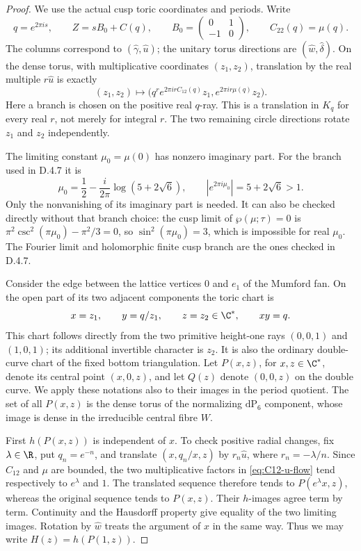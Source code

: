 \begin{proof}
We use the actual cusp toric coordinates and periods. Write
\[
 q=e^{2\pi i s},\qquad
 Z=sB_0+C(q),\qquad
 B_0=\begin{pmatrix}0&1\\-1&0\end{pmatrix},
 \qquad C_{22}(q)=\mu(q).
\]
The columns correspond to $(\widehat\gamma,\widehat u)$;
the unitary torus directions are $(\widehat w,\widehat\delta)$.
On the dense torus, with multiplicative coordinates $(z_1,z_2)$,
translation by the real multiple $r\widehat u$ is exactly
\begin{equation}\label{eq:C12-u-flow}
 (z_1,z_2)\longmapsto
 \bigl(q^r e^{2\pi i r C_{12}(q)}z_1,
             e^{2\pi i r\mu(q)}z_2\bigr).
\end{equation}
Here a branch is chosen on the positive real $q$-ray. This is a
translation in $K_q$ for every real $r$, not merely for integral $r$.
The two remaining circle directions rotate $z_1$ and $z_2$
independently.

The limiting constant $\mu_0=\mu(0)$ has nonzero imaginary part.
For the branch used in D.4.7 it is
\[
 \mu_0=\frac12-\frac{i}{2\pi}\log(5+2\sqrt6),\qquad
 |e^{2\pi i\mu_0}|=5+2\sqrt6>1.
\]
Only the nonvanishing of its imaginary part is needed. It can
also be checked directly without that branch choice: the cusp
limit of $\wp(\mu;\tau)=0$ is
$\pi^2\csc^2(\pi\mu_0)-\pi^2/3=0$, so
$\sin^2(\pi\mu_0)=3$, which is impossible for real $\mu_0$.
The Fourier limit and holomorphic finite cusp branch are the
ones checked in D.4.7.

Consider the edge between the lattice vertices $0$ and $e_1$
of the Mumford fan. On the open part of its two adjacent
components the toric chart is
\[
 x=z_1,\qquad y=q/z_1,\qquad z=z_2\in\C^*,
 \qquad xy=q.
\]
This chart follows directly from the two primitive height-one
rays $(0,0,1)$ and $(1,0,1)$; its additional invertible character
is $z_2$. It is also the ordinary double-curve chart of the
fixed bottom triangulation. Let $P(x,z)$, for $x,z\in\C^*$,
denote its central point $(x,0,z)$, and let $Q(z)$ denote
$(0,0,z)$ on the double curve. We apply these notations also
to their images in the period quotient. The set of all $P(x,z)$
is the dense torus of the normalizing $\mathrm{dP}_6$ component,
whose image is dense in the irreducible central fibre $W$.

First $h(P(x,z))$ is independent of $x$. To check positive
radial changes, fix $\lambda\in\R$, put $q_n=e^{-n}$, and
translate $(x,q_n/x,z)$ by
$r_n\widehat u$, where $r_n=-\lambda/n$. Since $C_{12}$ and
$\mu$ are bounded, the two multiplicative factors in
\eqref{eq:C12-u-flow} tend respectively to $e^\lambda$ and
$1$. The translated sequence therefore tends to $P(e^\lambda x,z)$,
whereas the original sequence tends to $P(x,z)$. Their $h$-images
agree term by term. Continuity and the Hausdorff property give
equality of the two limiting images. Rotation by
$\widehat w$ treats the argument of $x$ in the same way.
Thus we may write $H(z)=h(P(1,z))$.


\end{proof}
